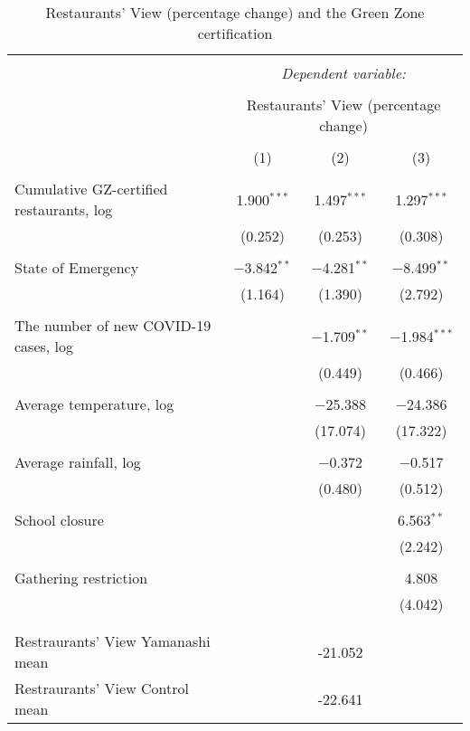 
\begin{table}[!htbp] \centering 
  \caption{Restaurants' View (percentage change) and the Green Zone certification} 
  \label{} 
\small 
\begin{tabular}{@{\extracolsep{1pt}}lccc} 
\\[-1.8ex]\hline 
\hline \\[-1.8ex] 
 & \multicolumn{3}{c}{\textit{Dependent variable:}} \\ 
\cline{2-4} 
\\[-1.8ex] & \multicolumn{3}{c}{Restaurants' View (percentage change) } \\ 
\\[-1.8ex] & (1) & (2) & (3)\\ 
\hline \\[-1.8ex] 
 Cumulative GZ-certified restaurants, log & 1.900$^{***}$ & 1.497$^{***}$ & 1.297$^{***}$ \\ 
  & (0.252) & (0.253) & (0.308) \\ 
  & & & \\ 
 State of Emergency & $-$3.842$^{**}$ & $-$4.281$^{**}$ & $-$8.499$^{**}$ \\ 
  & (1.164) & (1.390) & (2.792) \\ 
  & & & \\ 
 The number of new COVID-19 cases, log &  & $-$1.709$^{**}$ & $-$1.984$^{***}$ \\ 
  &  & (0.449) & (0.466) \\ 
  & & & \\ 
 Average temperature, log &  & $-$25.388 & $-$24.386 \\ 
  &  & (17.074) & (17.322) \\ 
  & & & \\ 
 Average rainfall, log &  & $-$0.372 & $-$0.517 \\ 
  &  & (0.480) & (0.512) \\ 
  & & & \\ 
 School closure &  &  & 6.563$^{**}$ \\ 
  &  &  & (2.242) \\ 
  & & & \\ 
 Gathering restriction &  &  & 4.808 \\ 
  &  &  & (4.042) \\ 
  & & & \\ 
\hline \\[-1.8ex] 
Restraurants' View Yamanashi mean &  & -21.052 &  \\ 
Restraurants' View Control mean &  & -22.641 &  \\ 

\end{tabular}
\end{table}
